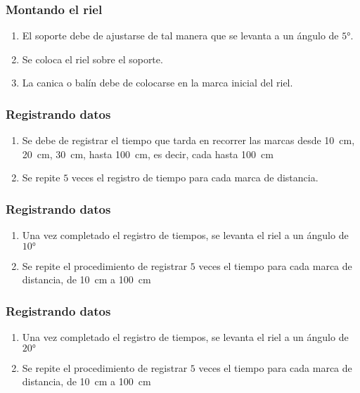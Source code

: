\documentclass[14pt]{beamer}
\begin{document}
\begin{frame}
\frametitle{Montando el riel}
\begin{enumerate}[<+->]
\item El soporte debe de ajustarse de tal manera que se levanta a un ángulo de $\ang{5}$.
\item Se coloca el riel sobre el soporte.
\item La canica o balín debe de colocarse en la marca inicial del riel.
\seti
\end{enumerate}
\end{frame}
\begin{frame}
\frametitle{Registrando datos}
    \begin{enumerate}[<+->]
\conti    
\item Se debe de registrar el tiempo que tarda en recorrer las marcas desde \SI{10}{\centi\meter}, \SI{20}{\centi\meter}, \SI{30}{\centi\meter}, hasta \SI{100}{\centi\meter}, es decir, cada hasta \SI{100}{\centi\meter}
\item Se repite $5$ veces el registro de tiempo para cada marca de distancia.
\end{enumerate}
\end{frame}
\begin{frame}
\frametitle{Registrando datos}
    \begin{enumerate}[<+->]
\conti    
\item Una vez completado el registro de tiempos, se levanta el riel a un ángulo de $\ang{10}$
\item Se repite el procedimiento de registrar $5$ veces el tiempo para cada marca de distancia, de \SI{10}{\centi\meter} a \SI{100}{\centi\meter}
\end{enumerate}
\end{frame}
\begin{frame}
\frametitle{Registrando datos}
    \begin{enumerate}[<+->]
\conti    
\item Una vez completado el registro de tiempos, se levanta el riel a un ángulo de $\ang{20}$
\item Se repite el procedimiento de registrar $5$ veces el tiempo para cada marca de distancia, de \SI{10}{\centi\meter} a \SI{100}{\centi\meter}
\end{enumerate}
\end{frame}
\end{document}
